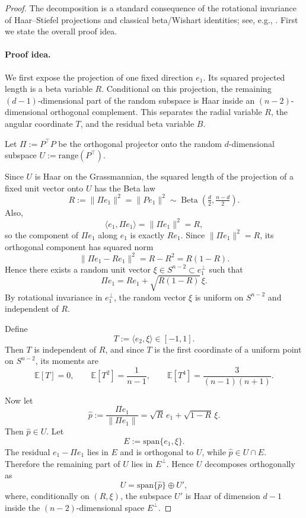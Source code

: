 \documentclass{article}
\DeclareMathOperator{\BetaDist}{Beta}
\begin{document}
\begin{proof}
The decomposition is a standard consequence of the rotational invariance of
Haar--Stiefel projections and classical beta/Wishart identities; see, e.g.,
\cite{Muirhead1982}. First we state the overall proof idea.
\paragraph{Proof idea.}
We first expose the projection of one fixed direction \(e_1\). Its squared
projected length is a beta variable \(R\). Conditional on this projection, the
remaining \((d-1)\)-dimensional part of the random subspace is Haar inside an
\((n-2)\)-dimensional orthogonal complement. This separates the radial variable
\(R\), the angular coordinate \(T\), and the residual beta variable \(B\).


Let $\Pi:=P^\top P$ be the orthogonal projector onto the random $d$-dimensional subspace $U:=\mathrm{range}(P^\top)$.

Since $U$ is Haar on the Grassmannian, the squared length of the projection of a fixed unit vector onto $U$ has the Beta law
\[
R:=\|\Pi e_1\|^2=\|Pe_1\|^2
\sim \BetaDist\!\left(\tfrac d2,\tfrac{n-d}2\right).
\]
Also,
\[
\langle e_1,\Pi e_1\rangle=\|\Pi e_1\|^2=R,
\]
so the component of $\Pi e_1$ along $e_1$ is exactly $Re_1$.
Since $\|\Pi e_1\|^2=R$, its orthogonal component has squared norm
\[
\|\Pi e_1-Re_1\|^2 = R-R^2 = R(1-R).
\]
Hence there exists a random unit vector $\xi\in S^{n-2}\subset e_1^\perp$ such that
\begin{equation}
\Pi e_1 = R e_1 + \sqrt{R(1-R)}\,\xi.
\label{eq:A3_Pi_e1_rep}
\end{equation}
By rotational invariance in $e_1^\perp$, the random vector $\xi$ is uniform on $S^{n-2}$ and independent of $R$.

Define
\[
T:=\langle e_2,\xi\rangle\in[-1,1].
\]
Then $T$ is independent of $R$, and since $T$ is the first coordinate of a uniform point on $S^{n-2}$, its moments are
\[
\mathbb E[T]=0,
\qquad
\mathbb E[T^2]=\frac{1}{n-1},
\qquad
\mathbb E[T^4]=\frac{3}{(n-1)(n+1)}.
\]

Now let
\[
\widehat p:=\frac{\Pi e_1}{\|\Pi e_1\|}=\sqrt{R}\,e_1+\sqrt{1-R}\,\xi.
\]
Then $\widehat p\in U$.
Let
\[
E:=\mathrm{span}\{e_1,\xi\}.
\]
The residual $e_1-\Pi e_1$ lies in $E$ and is orthogonal to $U$, while $\widehat p\in U\cap E$.
Therefore the remaining part of $U$ lies in $E^\perp$.
Hence $U$ decomposes orthogonally as
\[
U=\mathrm{span}\{\widehat p\}\oplus U',
\]
where, conditionally on $(R,\xi)$, the subspace $U'$ is Haar of dimension $d-1$ inside the $(n-2)$-dimensional space $E^\perp$.


\end{proof}
\end{document}
